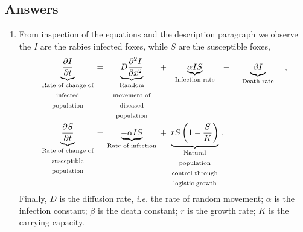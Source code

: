 \documentclass[10pt]{article}
\newcommand{\D}[2]{\frac{\partial #1}{\partial #2}}
\newcommand{\DD}[2]{\frac{\partial^2 #1}{\partial #2^2}}
\newcommand{\ie}{\emph{i.e.} }
\renewcommand{\l}{\left(}
\renewcommand{\r}{\right)}
\begin{document}
\begin{Answ}
\subsection{Answers}
\begin{enumerate}
\item From inspection of the equations and the description paragraph we observe the $I$ are the rabies infected foxes, while $S$ are the susceptible foxes,
\begin{align}
\underbrace{\D{I}{t}}_{\textrm{\parbox{8em}{\centering Rate of change of infected population}}}=&\underbrace{D\DD{I}{x}}_{\textrm{\parbox{8em}{\centering Random movement of diseased population}}}+\underbrace{\alpha IS}_{\textrm{\parbox{8em}{\centering Infection rate}}}-\underbrace{\beta I}_{\textrm{\parbox{8em}{\centering Death rate}}},\\
\underbrace{\D{S}{t}}_{\textrm{\parbox{8em}{\centering Rate of change of susceptible population}}}=&\underbrace{-\alpha IS}_{\textrm{\parbox{8em}{\centering Rate of infection}}}+\underbrace{rS\l 1-\frac{S}{K}\r}_{\textrm{\parbox{8em}{\centering Natural population control through logistic growth}}},
\end{align}
Finally, $D$ is the diffusion rate, \ie the rate of random movement; $\alpha$ is the infection constant; $\beta$ is the death constant; $r$ is the growth rate; $K$ is the carrying capacity. 


\end{enumerate}
\end{Answ}
\end{document}
